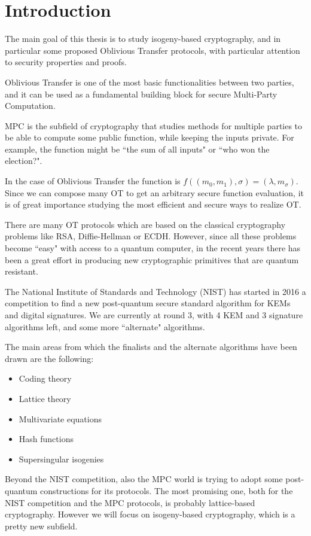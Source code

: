 \chapter*{Introduction}

The main goal of this thesis is to study isogeny-based cryptography, and in particular some proposed Oblivious Transfer protocols, with particular attention to security properties and proofs.

Oblivious Transfer is one of the most basic functionalities between two parties, and it can be used as a fundamental building block for secure Multi-Party Computation.

MPC is the subfield of cryptography that studies methods for multiple parties to be able to compute some public function, while keeping the inputs private. For example, the function might be ``the sum of all inputs" or ``who won the election?".

In the case of Oblivious Transfer the function is $f((m_0,m_1),\sigma)=(\lambda,m_\sigma)$. Since we can compose many OT to get an arbitrary secure function evaluation, it is of great importance studying the most efficient and secure ways to realize OT.

There are many OT protocols which are based on the classical cryptography problems like RSA, Diffie-Hellman or ECDH. However, since all these problems become ``easy" with access to a quantum computer, in the recent years there has been a great effort in producing new cryptographic primitives that are quantum resistant.

The National Institute of Standards and Technology (NIST) has started in 2016 a competition to find a new post-quantum secure standard algorithm for KEMs and digital signatures. We are currently at round 3, with 4 KEM and 3 signature algorithms left, and some more ``alternate" algorithms.

The main areas from which the finalists and the alternate algorithms have been drawn are the following:
\begin{itemize}
    \item Coding theory
    \item Lattice theory
    \item Multivariate equations
    \item Hash functions
    \item Supersingular isogenies
\end{itemize}

Beyond the NIST competition, also the MPC world is trying to adopt some post-quantum constructions for its protocols. The most promising one, both for the NIST competition and the MPC protocols, is probably lattice-based cryptography. However we will focus on isogeny-based cryptography, which is a pretty new subfield.

